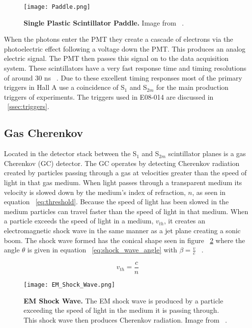 \begin{figure}[!ht]
\begin{center}
\texttt{[image: Paddle.png]}
\end{center}
\caption{
{\bf{Single Plastic Scintillator Paddle.}} Image from ~\cite{Thesis:Wang}.}
\label{fig:paddle}
\end{figure}

When the photons enter the PMT they create a cascade of electrons via the photoelectric effect following a voltage down the PMT. This produces an analog electric signal. The PMT then passes this signal on to the data acquisition system. These scintillators have a very fast response time and timing resolutions of around 30 ns ~\cite{Thesis:Ye}. Due to these excellent timing responses most of the primary triggers in Hall A use a coincidence of S$_1$ and S$_{2m}$ for the main production triggers of experiments. The triggers used in E08-014 are discussed in ~\ref{ssec:triggers}. 

\subsection{Gas Cherenkov}
\label{ssec:gc}

Located in the detector stack between the S$_1$ and S$_{2m}$ scintillator planes is a gas Cherenkov (GC) detector. The GC operates by detecting Cherenkov radiation created by particles passing through a gas at velocities greater than the speed of light in that gas medium. When light passes through a transparent medium its velocity is slowed down by the medium's index of refraction, $n$, as seen in equation ~\ref{eq:threshold}. Because the speed of light has been slowed in the medium particles can travel faster than the speed of light in that medium. When a particle exceeds the speed of light in a medium, $v_{th}$, it creates an electromagnetic shock wave in the same manner as a jet plane creating a sonic boom. The shock wave formed has the conical shape seen in figure ~\ref{fig:em_shock_wave} where the angle $\theta$ is given in equation ~\ref{eq:shock_wave_angle} with $\beta = \frac{v}{c}$ ~\cite{Book:Leo}.

\begin{equation} \label{eq:threshold}
	v_{th} = \frac{c}{n}
\end{equation}

\begin{figure}[!ht]
\begin{center}
\texttt{[image: EM\_Shock\_Wave.png]}
\end{center}
\caption{
{\bf{EM Shock Wave.}} The EM shock wave is produced by a particle exceeding the speed of light in the medium it is passing through. This shock wave then produces Cherenkov radiation. Image from ~\cite{Thesis:Cummings}.}
\label{fig:em_shock_wave}
\end{figure}

